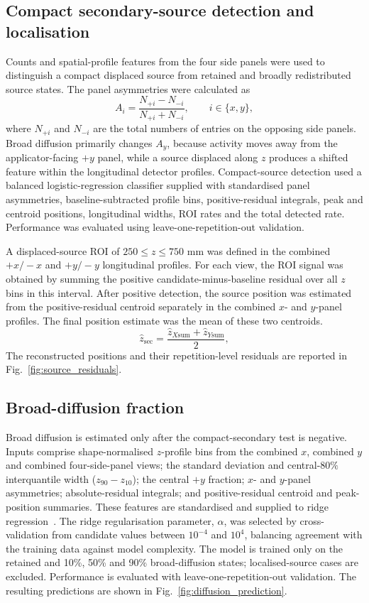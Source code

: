 \documentclass{iopconfser}
\begin{document}
\subsection{Compact secondary-source detection and localisation}

Counts and spatial-profile features from the four side panels were used to distinguish a compact displaced source from retained and broadly redistributed source states. The panel asymmetries were calculated as
\[
A_i=\frac{N_{+i}-N_{-i}}{N_{+i}+N_{-i}},\qquad i\in\{x,y\},
\]where \(N_{+i}\) and \(N_{-i}\) are the total numbers of entries on the opposing side panels. Broad diffusion primarily changes \(A_y\), because activity moves away from the applicator-facing \(+y\) panel, while a source displaced along \(z\) produces a shifted feature within the longitudinal detector profiles.
Compact-source detection used a balanced logistic-regression classifier supplied with standardised panel asymmetries, baseline-subtracted profile bins, positive-residual integrals, peak and centroid positions, longitudinal widths, ROI rates and the total detected rate. Performance was evaluated using leave-one-repetition-out validation.

A displaced-source ROI of \(250\leq z\leq750\) mm was defined in the combined \(+x/-x\) and \(+y/-y\) longitudinal profiles. For each view, the ROI signal was obtained by summing the positive candidate-minus-baseline residual over all \(z\) bins in this interval. After positive detection, the source position was estimated from the positive-residual centroid separately in the combined \(x\)- and \(y\)-panel profiles. The final position estimate was the mean of these two centroids.
\[
\hat z_{\mathrm{sec}}=
\frac{\hat z_{X\mathrm{sum}}+\hat z_{Y\mathrm{sum}}}{2},
\]
The reconstructed positions and their repetition-level residuals are reported
in Fig.~\ref{fig:source_residuals}.

\subsection{Broad-diffusion fraction}

Broad diffusion is estimated only after the compact-secondary test is
negative. Inputs comprise shape-normalised \(z\)-profile bins from the
combined \(x\), combined \(y\) and combined four-side-panel views; the standard deviation and central-$80\%$ interquantile width ($z_{90}-z_{10}$); the central \(+y\) fraction; \(x\)- and \(y\)-panel
asymmetries; absolute-residual integrals; and positive-residual centroid and peak-position summaries. These
features are standardised and supplied to ridge regression~\cite{RidgeRegression}. The ridge regularisation parameter, \(\alpha\), was selected by cross-validation from candidate values between \(10^{-4}\) and \(10^4\), balancing agreement with the training data against model complexity. The model is trained only on the retained and
10\%, 50\% and 90\% broad-diffusion states; localised-source cases are
excluded. Performance is evaluated with leave-one-repetition-out validation.
The resulting predictions are shown in Fig.~\ref{fig:diffusion_prediction}.
\end{document}
